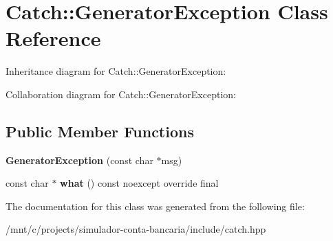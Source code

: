 \hypertarget{classCatch_1_1GeneratorException}{}\section{Catch\+:\+:Generator\+Exception Class Reference}
\label{classCatch_1_1GeneratorException}


Inheritance diagram for Catch\+:\+:Generator\+Exception\+:


Collaboration diagram for Catch\+:\+:Generator\+Exception\+:
\subsection*{Public Member Functions}
\begin{DoxyCompactItemize}
\item 
\mbox{\label{classCatch_1_1GeneratorException_a3cf9282d555ec32389665ce723bf36ea}} 
{\bfseries Generator\+Exception} (const char $\ast$msg)
\item 
\mbox{\label{classCatch_1_1GeneratorException_ade029163144d136f12187e5b9a0161d5}} 
const char $\ast$ {\bfseries what} () const noexcept override final
\end{DoxyCompactItemize}


The documentation for this class was generated from the following file\+:\begin{DoxyCompactItemize}
\item 
/mnt/c/projects/simulador-\/conta-\/bancaria/include/catch.\+hpp\end{DoxyCompactItemize}
